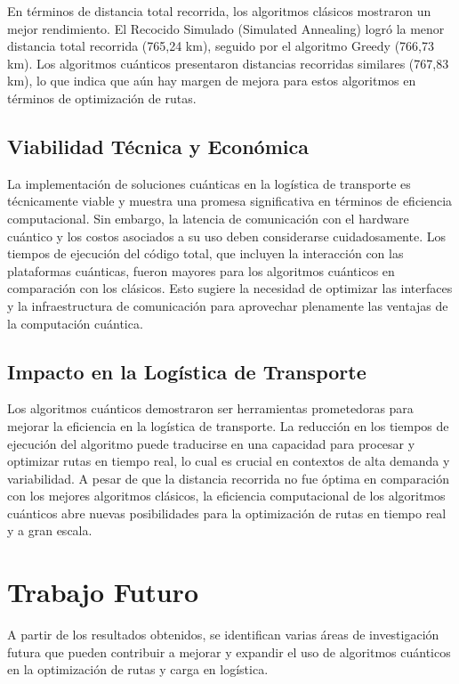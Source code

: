 \documentclass[11pt,a4paper,spanish]{book}
\begin{document}
En términos de distancia total recorrida, los algoritmos clásicos mostraron un mejor rendimiento. El Recocido Simulado (Simulated Annealing) logró la menor distancia total recorrida (765,24 km), seguido por el algoritmo Greedy (766,73 km). Los algoritmos cuánticos presentaron distancias recorridas similares (767,83 km), lo que indica que aún hay margen de mejora para estos algoritmos en términos de optimización de rutas.

\subsection{Viabilidad Técnica y Económica}

La implementación de soluciones cuánticas en la logística de transporte es técnicamente viable y muestra una promesa significativa en términos de eficiencia computacional. Sin embargo, la latencia de comunicación con el hardware cuántico y los costos asociados a su uso deben considerarse cuidadosamente. Los tiempos de ejecución del código total, que incluyen la interacción con las plataformas cuánticas, fueron mayores para los algoritmos cuánticos en comparación con los clásicos. Esto sugiere la necesidad de optimizar las interfaces y la infraestructura de comunicación para aprovechar plenamente las ventajas de la computación cuántica.

\subsection{Impacto en la Logística de Transporte}

Los algoritmos cuánticos demostraron ser herramientas prometedoras para mejorar la eficiencia en la logística de transporte. La reducción en los tiempos de ejecución del algoritmo puede traducirse en una capacidad para procesar y optimizar rutas en tiempo real, lo cual es crucial en contextos de alta demanda y variabilidad. A pesar de que la distancia recorrida no fue óptima en comparación con los mejores algoritmos clásicos, la eficiencia computacional de los algoritmos cuánticos abre nuevas posibilidades para la optimización de rutas en tiempo real y a gran escala.

\section{Trabajo Futuro}

A partir de los resultados obtenidos, se identifican varias áreas de investigación futura que pueden contribuir a mejorar y expandir el uso de algoritmos cuánticos en la optimización de rutas y carga en logística.
\end{document}
